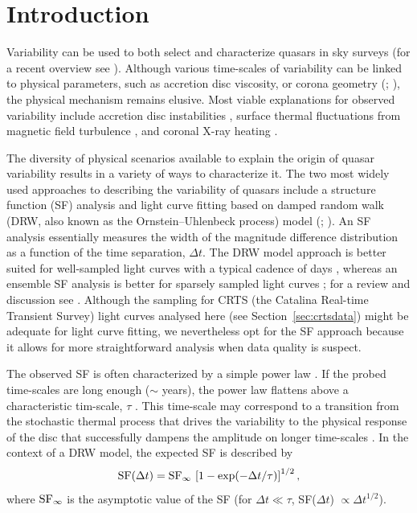 \documentclass[fleqn,usenatbib]{mnras}
\begin{document}
\section{Introduction}
Variability can be used to both select and characterize quasars in sky surveys (for a recent overview see \citealt{lawrence2016a}). Although various time-scales of variability can be linked to physical parameters, such as accretion disc viscosity, or corona geometry (\citealt{kelly2011}; \citealt{graham2014}), the physical mechanism remains elusive. Most viable explanations for observed
variability include accretion disc instabilities \citep{kawaguchi1998}, surface thermal fluctuations from magnetic field turbulence \citep{kelly2009}, and
coronal X-ray heating \citep[][see \citealt{kozlowski2016} for a review]{kelly2011}.

The diversity of  physical scenarios available to explain the origin of quasar variability results in a variety of ways to characterize it. The two most widely used approaches to describing the variability of quasars include a structure function (SF) analysis and light curve
fitting based on damped random walk (DRW, also known as the Ornstein--Uhlenbeck process) model (\citealt{kelly2007}; \citealt{macleod2011}). An SF analysis essentially measures the 
width of the magnitude difference distribution as a function of the time separation, $\Delta t$. 
The DRW model approach is better suited for well-sampled light curves with a typical cadence of days \citep{zu2013, kozlowski2016}, whereas an ensemble SF analysis is better for sparsely sampled light curves \citep{hawkins2002, berk2004,  devries2005}; for a review and discussion see \cite{kozlowski2016}. Although the sampling for CRTS (the Catalina Real-time Transient Survey) light curves 
analysed here (see Section~\ref{sec:crtsdata}) might be adequate for light curve fitting, we nevertheless opt for 
the SF approach because it allows for more straightforward analysis when data quality is suspect. 

The observed SF is often characterized by a simple power law \citep{schmidt2010}. If the probed time-scales are long enough 
($\sim$ years), the power law flattens above a characteristic tim-scale, $\tau$ \citep{2004Ivezic, kelly2007, macleod2010}.
This time-scale may correspond to a transition from the stochastic thermal process that drives the variability to the physical 
response of the disc that successfully  dampens the amplitude on longer time-scales \citep{peterson2001, kelly2007, kelly2009, 
kelly2011, lawrence2016a}. In the context of a DRW model, the expected SF is described by 
\begin{equation}
\label{eq:DRWSF}
        {\rm SF}(\Delta t) = {\rm SF}_\infty \, \left[1 - \exp(-\Delta t / \tau) \right]^{1/2},
\end{equation}
where ${\rm SF}_\infty$ is the asymptotic value of the SF (for $\Delta t \ll \tau$, SF($\Delta t$) $\propto \Delta t^{1/2}$). 
\end{document}
